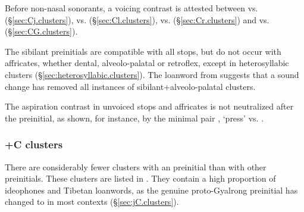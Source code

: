 Before non-nasal sonorants, a voicing contrast is attested between  vs.  (§\ref{sec:Cj.clusters}),  vs.  (§\ref{sec:Cl.clusters}),  vs.  (§\ref{sec:Cr.clusters}) and  vs.  (§\ref{sec:CG.clusters}).

The sibilant preinitials are compatible with all stops, but do not occur with affricates, whether dental, alveolo-palatal or retroflex, except in heterosyllabic clusters (§\ref{sec:heterosyllabic.clusters}). The loanword  from  suggests that a sound change  \fl{}  has removed all instances of sibilant+al\-veolo-palatal clusters.

The aspiration contrast in unvoiced stops and affricates is not neutralized after the  preinitial, as shown, for instance, by the minimal pair  , `press' vs. .

\subsubsection{+C clusters}  \label{sec:lC.clusters}


There are considerably fewer clusters with an  preinitial
than with other preinitials. These clusters are listed in . They contain a high proportion of ideophones and Tibetan loanwords, as the genuine proto-Gyalrong  preinitial has changed to  in most contexts (§\ref{sec:jC.clusters}).

